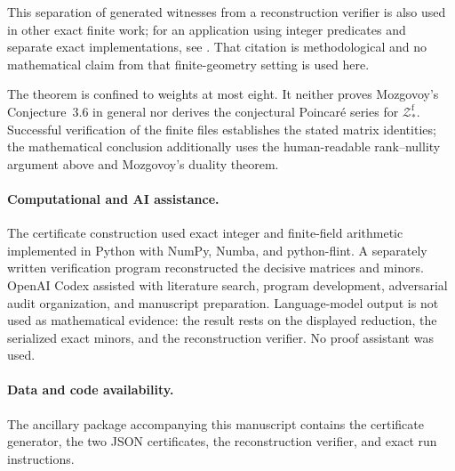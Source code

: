 \documentclass[11pt]{article}
\newcommand{\Zf}{\mathcal{Z}^{\mathrm f}_*}
\begin{document}
This separation of generated witnesses from a reconstruction verifier is also
used in other exact finite work; for an application using integer predicates
and separate exact implementations, see
\cite{ZengEtAl2026}.  That citation is methodological and no mathematical
claim from that finite-geometry setting is used here.

The theorem is confined to weights at most eight.  It neither proves
Mozgovoy's Conjecture~3.6 in general nor derives the conjectural Poincar\'e
series for \(\Zf\).  Successful verification of the finite files establishes
the stated matrix identities; the mathematical conclusion additionally uses
the human-readable rank--nullity argument above and Mozgovoy's duality theorem.

\paragraph{Computational and AI assistance.}
The certificate construction used exact integer and finite-field arithmetic
implemented in Python with NumPy, Numba, and python-flint.  A separately
written verification program reconstructed the decisive matrices and minors.
OpenAI Codex assisted with literature search, program development, adversarial
audit organization, and manuscript preparation.  Language-model output is
not used as mathematical evidence: the result rests on the displayed
reduction, the serialized exact minors, and the reconstruction verifier.  No
proof assistant was used.

\paragraph{Data and code availability.}
The ancillary package accompanying this manuscript contains the certificate
generator, the two JSON certificates, the reconstruction verifier, and exact
run instructions.

\raggedright


\end{document}
